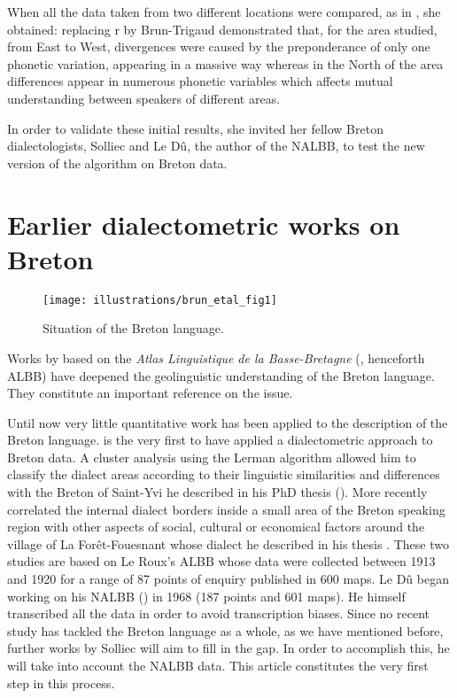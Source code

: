 \documentclass[output=paper]{LSP/langsci}
\begin{document}
When all the data taken from two different locations were compared, as in , she obtained: replacing {r} by 
Brun-Trigaud demonstrated that, for the area studied, from East to West, divergences were caused by the preponderance of only one phonetic variation, appearing in a massive way whereas in the North of the area differences appear in numerous phonetic variables which affects mutual understanding between speakers of different areas.

In order to validate these initial results, she invited her fellow Breton dialectologists, Solliec and Le Dû, the author of the NALBB, to test the new version of the algorithm on Breton data.

\section[Earlier dialectometric works on Breton ]{Earlier dialectometric works on Breton }
  
\begin{figure}
\texttt{[image: illustrations/brun\_etal\_fig1]}
\caption{Situation of the Breton language.}
\label{fig:1}
\end{figure}

Works by \citet{falchun_perspectives_1981} based on the \textit{Atlas Linguistique de la Basse-Bretagne} (\citealt{le_roux_atlas_1924}, henceforth ALBB) have deepened the geolinguistic understanding of the Breton language. They constitute an important reference on the issue. 

Until now very little quantitative work has been applied to the description of the Breton language. \citet{german_etude_1984,german_methode_1991} is the very first to have applied a dialectometric approach to Breton data. A cluster analysis using the Lerman algorithm allowed him to classify the dialect areas according to their linguistic similarities and differences with the Breton of Saint-Yvi he described in his PhD thesis (\citeyear{german_etude_1984}). More recently \citet{costaouec_linguistic_2012} correlated the internal dialect borders inside a small area of the Breton speaking region with other aspects of social, cultural or economical factors around the village of La Forêt-Fouesnant whose dialect he described in his thesis \citet{costaouec_breton_1998}. These two studies are based on Le Roux’s ALBB whose data were collected between 1913 and 1920 for a range of 87 points of enquiry published in 600 maps. Le Dû began working on his NALBB (\citeyear{le_du_nouvel_2001}) in 1968 (187 points and 601 maps). He himself transcribed all the data in order to avoid transcription biases. Since no recent study has tackled the Breton language as a whole, as we have mentioned before, further works by Solliec will aim to fill in the gap. In order to accomplish this, he will take into account the NALBB data. This article constitutes the very first step in this process.
\end{document}

